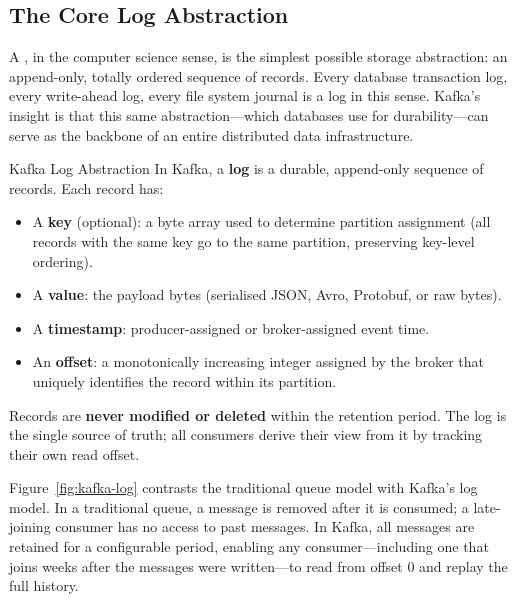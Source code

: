 \subsection{The Core Log Abstraction}
\label{subsec:kafka-log}

A , in the computer science sense, is the simplest possible
storage abstraction: an append-only, totally ordered sequence of records.
Every database transaction log, every write-ahead log, every file system
journal is a log in this sense. Kafka's insight is that this same
abstraction---which databases use for durability---can serve as the
backbone of an entire distributed data infrastructure.

\begin{defbox}{Kafka Log Abstraction}
In Kafka, a \textbf{log} is a durable, append-only sequence of records.
Each record has:
\begin{itemize}
  \item A \textbf{key} (optional): a byte array used to determine partition
        assignment (all records with the same key go to the same partition,
        preserving key-level ordering).
  \item A \textbf{value}: the payload bytes (serialised JSON, Avro, Protobuf,
        or raw bytes).
  \item A \textbf{timestamp}: producer-assigned or broker-assigned event time.
  \item An \textbf{offset}: a monotonically increasing integer assigned by the
        broker that uniquely identifies the record within its partition.
\end{itemize}
Records are \textbf{never modified or deleted} within the retention period.
The log is the single source of truth; all consumers derive their view
from it by tracking their own read offset.
\end{defbox}

Figure~\ref{fig:kafka-log} contrasts the traditional queue model with
Kafka's log model. In a traditional queue, a message is removed after
it is consumed; a late-joining consumer has no access to past messages.
In Kafka, all messages are retained for a configurable period, enabling
any consumer---including one that joins weeks after the messages were
written---to read from offset 0 and replay the full history.

